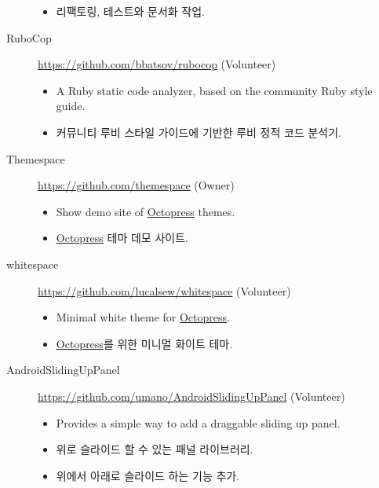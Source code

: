 \documentclass[a4paper,10pt]{article}
\begin{document}
\begin{description}
\begin{itemize}
      \item 리팩토링, 테스트와 문서화 작업.
    \end{itemize}
  \item[RuboCop] \url{https://github.com/bbatsov/rubocop} (Volunteer)
    \begin{itemize}
      \item A Ruby static code analyzer, based on the community Ruby style guide.
      \item 커뮤니티 루비 스타일 가이드에 기반한 루비 정적 코드 분석기.
    \end{itemize}
  \item[Themespace] \url{https://github.com/themespace} (Owner)
    \begin{itemize}
      \item Show demo site of \href{http://octopress.org}{Octopress} themes.
      \item \href{http://octopress.org}{Octopress} 테마 데모 사이트.
    \end{itemize}
  \item[whitespace] \url{https://github.com/lucalsew/whitespace} (Volunteer)
    \begin{itemize}
      \item Minimal white theme for \href{http://octopress.org}{Octopress}.
      \item \href{http://octopress.org}{Octopress}를 위한 미니멀 화이트 테마.
    \end{itemize}
  \item[AndroidSlidingUpPanel] \url{https://github.com/umano/AndroidSlidingUpPanel} (Volunteer)
    \begin{itemize}
      \item Provides a simple way to add a draggable sliding up panel.
      \item 위로 슬라이드 할 수 있는 패널 라이브러리.
      \item 위에서 아래로 슬라이드 하는 기능 추가.
    \end{itemize}
\end{description}


\end{document}

